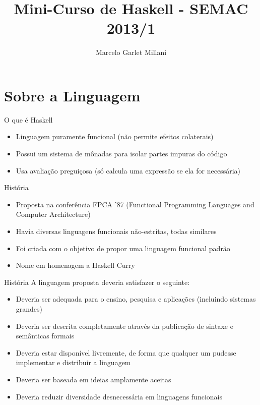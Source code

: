 \documentclass{beamer}
\title{Mini-Curso de Haskell - SEMAC 2013/1}
\author[M. Millani]{Marcelo Garlet Millani}
\institute[II/UFRGS]{Universidade Federal do Rio Grande do Sul \\ Instituto de Informática \\ Grupo PET Computação}
\begin{document}
	\begin{frame}
		\maketitle
	\end{frame}

\section{Sobre a Linguagem}
	\begin{frame}{O que é Haskell}
		\begin{itemize}
		 \item Linguagem puramente funcional (não permite efeitos colaterais)
		 \item Possui um sistema de mônadas para isolar partes impuras do código
		 \item Usa avaliação preguiçosa (só calcula uma expressão se ela for necessária)
		\end{itemize}
	\end{frame}
	
	\begin{frame}{História}
	 
	 \begin{itemize}
	  \item Proposta na conferência FPCA '87 (Functional Programming Languages and Computer Architecture)
	  \item Havia diversas linguagens funcionais não-estritas, todas similares
	  \item Foi criada com o objetivo de propor uma linguagem funcional padrão
	  \item Nome em homenagem a Haskell Curry
	 \end{itemize}
	\end{frame}
	
	\begin{frame}{História}
	 A linguagem proposta deveria satisfazer o seguinte:
	 \begin{itemize}
	  \item Deveria ser adequada para o ensino, pesquisa e aplicações (incluindo sistemas grandes)
	  \item Deveria ser descrita completamente através da publicação de sintaxe e semânticas formais
	  \item Deveria estar disponível livremente, de forma que qualquer um pudesse implementar e distribuir a linguagem
	  \item Deveria ser baseada em ideias amplamente aceitas
	  \item Deveria reduzir diversidade desnecessária em linguagens funcionais
	 \end{itemize}
	\end{frame}
	
\end{document}
